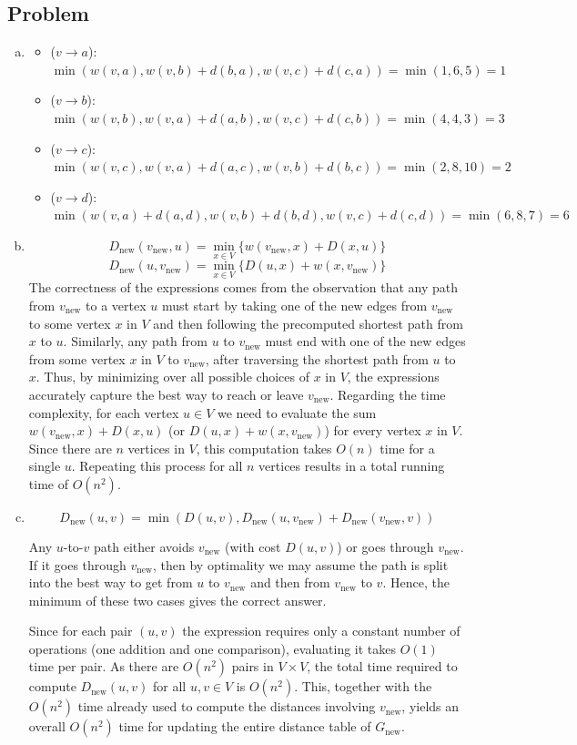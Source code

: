 \documentclass[12pt, letterpaper]{article}
\theoremstyle{definition}
\newcounter{problem}
\newcommand{\q}{
    \newpage %
    \stepcounter{problem} %
    \subsection*{Problem \arabic{problem}} %
}
\begin{document}
\q
\begin{enumerate}[(a)]
    \item \begin{itemize}
        \item ($v \to a$): $\min(w(v,a),w(v,b)+d(b,a),w(v,c)+d(c,a))=\min(1,6,5)=1$
        \item ($v \to b$): $\min(w(v,b),w(v,a)+d(a,b),w(v,c)+d(c,b))=\min(4,4,3)=3$
        \item ($v \to c$): $\min(w(v,c),w(v,a)+d(a,c),w(v,b)+d(b,c))=\min(2,8,10)=2$
        \item ($v \to d$): $\min(w(v,a)+d(a,d),w(v,b)+d(b,d),w(v,c)+d(c,d))=\min(6,8,7)=6$
    \end{itemize}
    \item \[D_{\text{new}}(v_{\text{new}},u)=\min_{x \in V}\{w(v_{\text{new}},x)+D(x,u)\}\]
    \[D_{\text{new}}(u,v_{\text{new}})=\min_{x \in V}\{D(u,x)+w(x,v_{\text{new}})\}\]
    The correctness of the expressions comes from the observation that any path from \(v_{\text{new}}\) to a vertex \(u\) must start by taking one of the new edges from \(v_{\text{new}}\) to some vertex \(x\) in \(V\) and then following the precomputed shortest path from \(x\) to \(u\). Similarly, any path from \(u\) to \(v_{\text{new}}\) must end with one of the new edges from some vertex \(x\) in \(V\) to \(v_{\text{new}}\), after traversing the shortest path from \(u\) to \(x\). Thus, by minimizing over all possible choices of \(x\) in \(V\), the expressions accurately capture the best way to reach or leave \(v_{\text{new}}\). Regarding the time complexity, for each vertex \(u \in V\) we need to evaluate the sum \(w(v_{\text{new}}, x) + D(x,u)\) (or \(D(u,x) + w(x,v_{\text{new}})\)) for every vertex \(x\) in \(V\). Since there are \(n\) vertices in \(V\), this computation takes \(O(n)\) time for a single \(u\). Repeating this process for all \(n\) vertices results in a total running time of \(O(n^2)\).

    \item \[D_{\text{new}}(u,v)=\min(D(u,v),D_{\text{new}}(u,v_{\text{new}})+D_{\text{new}}(v_{\text{new}},v))\]

    Any \(u\)-to-\(v\) path either avoids \(v_{\text{new}}\) (with cost \(D(u,v)\)) or goes through \(v_{\text{new}}\). If it goes through \(v_{\text{new}}\), then by optimality we may assume the path is split into the best way to get from \(u\) to \(v_{\text{new}}\) and then from \(v_{\text{new}}\) to \(v\). Hence, the minimum of these two cases gives the correct answer. 

    Since for each pair \((u,v)\) the expression requires only a constant number of operations (one addition and one comparison), evaluating it takes \(O(1)\) time per pair. As there are \(O(n^2)\) pairs in \(V\times V\), the total time required to compute \(D_{\text{new}}(u,v)\) for all \(u,v\in V\) is \(O(n^2)\). This, together with the \(O(n^2)\) time already used to compute the distances involving \(v_{\text{new}}\), yields an overall \(O(n^2)\) time for updating the entire distance table of \(G_{\text{new}}\).
\end{enumerate}
\end{document}
